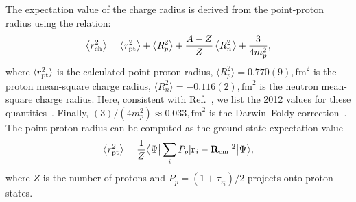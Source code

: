 The expectation value of the charge radius is derived from the point-proton radius using the relation:
\begin{align}
	\left\langle r_{\rm ch}^2\right\rangle=
	\left\langle r_{\rm pt}^2\right\rangle+
	\left\langle R_p^2\right\rangle+
	\frac{A-Z}{Z}\left\langle R_n^2\right\rangle+
	\frac{3}{4m_p^2},
	\label{eq:rch}
\end{align}
where $\langle r_{\rm pt}^2\rangle$ is the calculated point-proton radius,
$\langle R_p^2 \rangle = 0.770(9),\mathrm{fm}^2$ is the proton mean-square charge radius,
$\langle R_n^2 \rangle = -0.116(2),\mathrm{fm}^2$ is the neutron mean-square charge radius. Here, consistent with Ref.~\cite{Gnech2021}, we list the 2012 values for these quantities~\cite{beringer_review_2012}. Finally, $(3)/(4m_p^2) \approx 0.033,\mathrm{fm}^2$ is the Darwin–Foldy correction~\cite{friar_nuclear_1997}.
The point-proton radius can be computed as the ground-state expectation value
\begin{align}
	\left\langle r_{\rm pt}^2\right\rangle=\frac{1}{Z}\big\langle\Psi\big|\sum_i P_{p} |\mathbf{r}_i-\mathbf{R}_{\rm cm}|^2\big|\Psi\big\rangle,
\end{align}
where $Z$ is the number of protons and
$P_p = (1 + \tau_{z_i})/2$ projects onto proton states.

